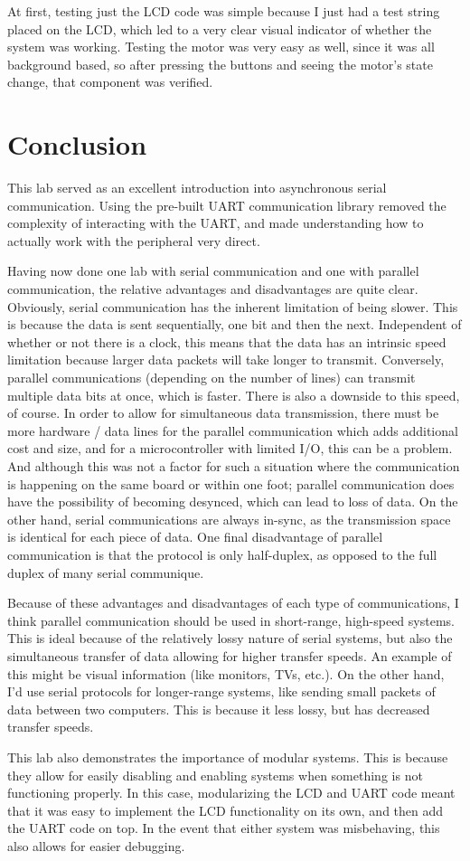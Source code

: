 \documentclass[a4paper, 12pt]{article}
\begin{document}
At first, testing just the LCD code was simple because I just had a test string placed on the LCD, which led to a very clear visual indicator of whether the system was working. Testing the motor was very easy as well, since it was all background based, so after pressing the buttons and seeing the motor's state change, that component was verified. 
 
\section{Conclusion}
This lab served as an excellent introduction into asynchronous serial communication. Using the pre-built UART communication library removed the complexity of interacting with the UART, and made understanding how to actually work with the peripheral very direct.

Having now done one lab with serial communication and one with parallel communication, the relative advantages and disadvantages are quite clear. Obviously, serial communication has the inherent limitation of being slower. This is because the data is sent sequentially, one bit and then the next. Independent of whether or not there is a clock, this means that the data has an intrinsic speed limitation because larger data packets will take longer to transmit. Conversely, parallel communications (depending on the number of lines) can transmit multiple data bits at once, which is faster. There is also a downside to this speed, of course. In order to allow for simultaneous data transmission, there must be more hardware / data lines for the parallel communication which adds additional cost and size, and for a microcontroller with limited I/O, this can be a problem. And although this was not a factor for such a situation where the communication is happening on the same board or within one foot; parallel communication does have the possibility of becoming desynced, which can lead to loss of data. On the other hand, serial communications are always in-sync, as the transmission space is identical for each piece of data. One final disadvantage of parallel communication is that the protocol is only half-duplex, as opposed to the full duplex of many serial communique.

Because of these advantages and disadvantages of each type of communications, I think parallel communication should be used in short-range, high-speed systems. This is ideal because of the relatively lossy nature of serial systems, but also the simultaneous transfer of data allowing for higher transfer speeds. An example of this might be visual information (like monitors, TVs, etc.). On the other hand, I'd use serial protocols for longer-range systems, like sending small packets of data between two computers. This is because it less lossy, but has decreased transfer speeds.

This lab also demonstrates the importance of modular systems. This is because they allow for easily disabling and enabling systems when something is not functioning properly. In this case, modularizing the LCD and UART code meant that it was easy to implement the LCD functionality on its own, and then add the UART code on top. In the event that either system was misbehaving, this also allows for easier debugging.
\end{document}
